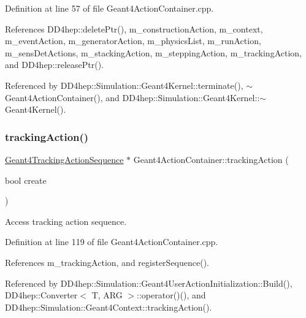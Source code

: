 Definition at line 57 of file Geant4\+Action\+Container.\+cpp.



References D\+D4hep\+::delete\+Ptr(), m\+\_\+construction\+Action, m\+\_\+context, m\+\_\+event\+Action, m\+\_\+generator\+Action, m\+\_\+physics\+List, m\+\_\+run\+Action, m\+\_\+sens\+Det\+Actions, m\+\_\+stacking\+Action, m\+\_\+stepping\+Action, m\+\_\+tracking\+Action, and D\+D4hep\+::release\+Ptr().



Referenced by D\+D4hep\+::\+Simulation\+::\+Geant4\+Kernel\+::terminate(), $\sim$\+Geant4\+Action\+Container(), and D\+D4hep\+::\+Simulation\+::\+Geant4\+Kernel\+::$\sim$\+Geant4\+Kernel().

\hypertarget{class_d_d4hep_1_1_simulation_1_1_geant4_action_container_a4ff088a46753f37dadc07e22a0436382}{}\label{class_d_d4hep_1_1_simulation_1_1_geant4_action_container_a4ff088a46753f37dadc07e22a0436382} 
\subsubsection{\texorpdfstring{tracking\+Action()}{trackingAction()}\hspace{0.1cm}{\footnotesize\ttfamily [1/2]}}
{\footnotesize\ttfamily \hyperlink{class_d_d4hep_1_1_simulation_1_1_geant4_tracking_action_sequence}{Geant4\+Tracking\+Action\+Sequence} $\ast$ Geant4\+Action\+Container\+::tracking\+Action (\begin{DoxyParamCaption}\item[{bool}]{create }\end{DoxyParamCaption})}



Access tracking action sequence. 



Definition at line 119 of file Geant4\+Action\+Container.\+cpp.



References m\+\_\+tracking\+Action, and register\+Sequence().



Referenced by D\+D4hep\+::\+Simulation\+::\+Geant4\+User\+Action\+Initialization\+::\+Build(), D\+D4hep\+::\+Converter$<$ T, A\+R\+G $>$\+::operator()(), and D\+D4hep\+::\+Simulation\+::\+Geant4\+Context\+::tracking\+Action().

